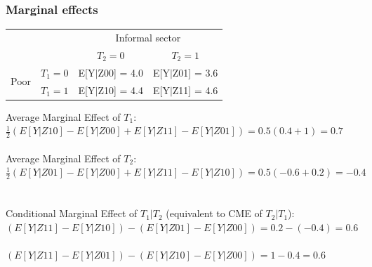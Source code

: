 \documentclass{beamer}\usepackage[]{graphicx}\usepackage[]{color}
\begin{document}
\begin{frame}[t]\frametitle{Marginal effects}
\begin{table}[tb]
	\centering

	\begin{tabular}{ll|cc}
	\hline

	\hline

	&\textbf{} & \multicolumn{2}{c}{Informal sector} \\
	&\textbf{} & \textbf{$T_2=0$} & \textbf{ $T_2=1$} \\
	\hline
\multirow{2}{*}{Poor}	&\textbf{$T_1=0$} & E[Y$|$Z00] = 4.0   & E[Y$|$Z01] = 3.6 \\
	                    &\textbf{$T_1=1$} & E[Y$|$Z10] = 4.4   & E[Y$|$Z11] = 4.6 \\
	\hline

	\hline
	\end{tabular}
\end{table}
    
\begin{small}
Average Marginal Effect of $T_1$: ~\\
$\frac{1}{2}(E[Y|Z10] - E[Y|Z00] + E[Y|Z11] - E[Y|Z01]) = 0.5(0.4 + 1) = 0.7$~\\~\\

Average Marginal Effect of $T_2$:~\\
$\frac{1}{2}(E[Y|Z01] - E[Y|Z00] + E[Y|Z11] - E[Y|Z10])= 0.5(-0.6 + 0.2) = -0.4$~\\~\\

Conditional Marginal Effect of $T_1|T_2$ (equivalent to CME of $T_2|T_1$):~\\
$(E[Y|Z11] - E[Y|Z10]) - (E[Y|Z01] - E[Y|Z00]) = 0.2 - (-0.4) = 0.6$~\\
$(E[Y|Z11] - E[Y|Z01]) - (E[Y|Z10] - E[Y|Z00]) = 1 - 0.4 = 0.6$
\end{small}
\end{frame}
\end{document}
